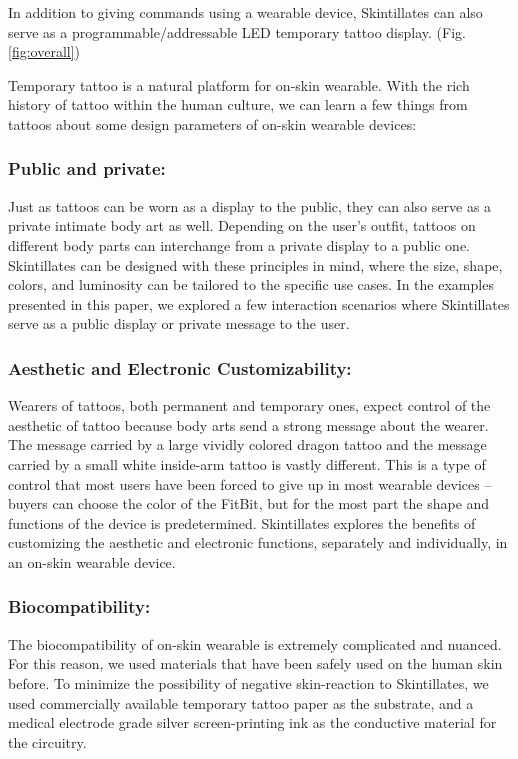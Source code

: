 \documentclass{sigchi}
\begin{document}
In addition to giving commands using a wearable device, Skintillates can also serve as a programmable/addressable LED temporary tattoo display. (Fig.\ref{fig:overall}) %

Temporary tattoo is a natural platform for on-skin wearable. With the rich history of tattoo within the human culture, we can learn a few things from tattoos about some design parameters of on-skin wearable devices: 

\subsubsection{Public and private:}
Just as tattoos can be worn as a display to the public, they can also serve as a private intimate body art as well. Depending on the user's outfit, tattoos on different body parts can interchange from a private display to a public one. Skintillates can be designed with these principles in mind, where the size, shape, colors, and luminosity can be tailored to the specific use cases. In the examples presented in this paper, we explored a few interaction scenarios where Skintillates serve as a public display or private message to the user. 
\subsubsection{Aesthetic and Electronic Customizability:}
Wearers of tattoos, both permanent and temporary ones, expect control of the aesthetic of tattoo because body arts send a strong message about the wearer. The message carried by a large vividly colored dragon tattoo and the message carried by a small white inside-arm tattoo is vastly different. This is a type of control that most users have been forced to give up in most wearable devices – buyers can choose the color of the FitBit, but for the most part the shape and functions of the device is predetermined. Skintillates explores the benefits of customizing the aesthetic and electronic functions, separately and individually, in an on-skin wearable device. 

\subsubsection{Biocompatibility:}
The biocompatibility of on-skin wearable is extremely complicated and nuanced. For this reason, we used materials that have been safely used on the human skin before. To minimize the possibility of negative skin-reaction to Skintillates, we used commercially available temporary tattoo paper as the substrate, and a medical electrode grade silver screen-printing ink as the conductive material for the circuitry. 
\end{document}
